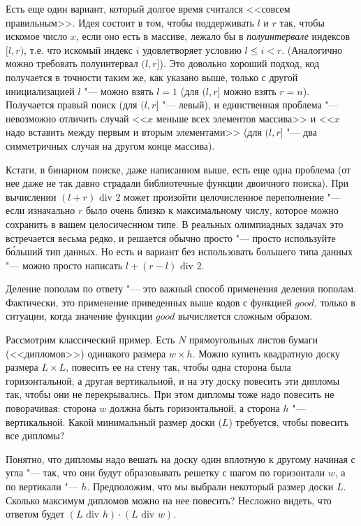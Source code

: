 \documentclass[a4paper,10pt]{problems}
\begin{document}
Есть еще один вариант, который долгое время считался <<совсем правильным>>. 
Идея состоит в том, чтобы поддерживать $l$ и $r$ так, чтобы искомое число $x$, 
если оно есть в массиве, лежало бы в \textit{полуинтервале} индексов $[l,r)$,
т.е. что искомый индекс $i$ удовлетворяет условию $l\leq i<r$.
(Аналогично можно требовать полуинтервал $(l,r]$).
Это довольно хороший подход, код получается в точности таким же, 
как указано выше, только с другой инициализацией $l$ "--- можно взять $l=1$
(для $(l,r]$ можно взять $r=n$).
Получается правый поиск (для $(l,r]$ "--- левый), и единственная проблема
"--- невозможно отличить случай <<$x$ меньше всех элементов массива>> и 
<<$x$ надо вставить между первым и вторым элементами>>
(для $(l,r]$ "--- два симметричных случая на другом конце массива).

Кстати, в бинарном поиске, даже написанном выше, есть еще одна проблема 
(от нее даже не так давно страдали библиотечные функции двоичного поиска).
При вычислении $(l+r)\mbox{ div }2$ может произойти целочисленное переполнение "---
если изначально $r$ было очень близко к максимальному числу, которое можно
сохранить в вашем целосичеснном типе. 
В реальных олимпиадных задачах это встречается весьма редко, и решается 
обычно просто "--- просто используйте б\'{о}льший тип данных.
Но есть и вариант без использовать большего типа данных
"--- можно просто написать $l+(r-l)\mbox{ div } 2$.

Деление пополам по ответу "--- это важный способ применения деления пополам.
Фактически, это применение приведенных выше кодов с функцией $good$, только 
в ситуации, когда значение функции $good$ вычисляется сложным образом.

Рассмотрим классический пример. 
Есть $N$ прямоугольных листов бумаги (<<дипломов>>) одинакого размера 
$w\times h$. Можно купить квадратную доску размера $L\times L$, 
повесить ее на стену так, чтобы одна сторона была горизонтальной,
а другая вертикальной, и на эту доску повесить эти дипломы так,
чтобы они не перекрывались. 
При этом дипломы тоже надо повесить не поворачивая: сторона $w$ должна быть
горизонтальной, а сторона $h$ "--- вертикальной.
Какой минимальный размер доски ($L$) требуется, чтобы повесить все дипломы?

Понятно, что дипломы надо вешать на доску один вплотную к другому 
начиная с угла "--- так, что они будут образовывать решетку с шагом
по горизонтали $w$, а по вертикали "--- $h$.
Предположим, что мы выбрали некоторый размер доски $L$.
Сколько максимум дипломов можно на нее повесить?
Несложно видеть, что ответом будет $(L\mbox{ div }h)\cdot(L\mbox{ div }w)$.
\end{document}
